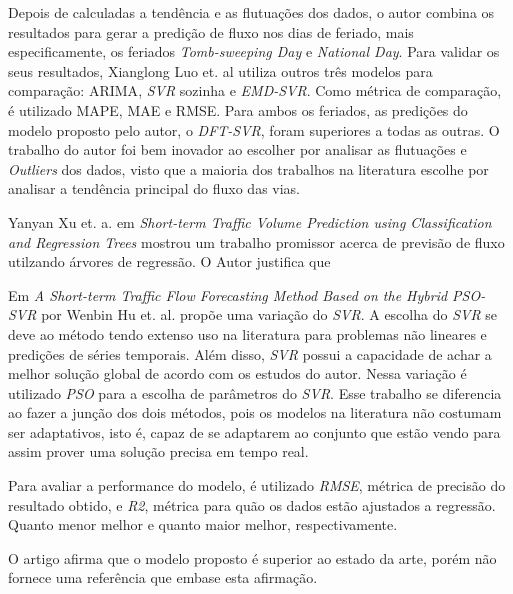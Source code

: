 Depois de calculadas a tendência e as flutuações dos dados, o autor combina os resultados para gerar a predição de fluxo nos dias de feriado, mais especificamente, os feriados \textit{ Tomb-sweeping Day} e \textit{National Day}. Para validar os seus resultados, Xianglong Luo et. al utiliza outros três modelos para comparação: \acrshort{ARIMA}, \textit{SVR} sozinha e \textit{EMD-SVR}. Como métrica de comparação, é utilizado \acrshort{MAPE}, \acrshort{MAE} e \acrshort{RMSE}.  Para ambos os feriados, as predições do modelo proposto pelo autor, o \textit{DFT-SVR}, foram superiores a todas as outras. O trabalho do autor foi bem inovador ao escolher por analisar as flutuações e \textit{Outliers} dos dados, visto que a maioria dos trabalhos na literatura escolhe por analisar a tendência principal do fluxo das vias.

Yanyan Xu et. a. em \textit{Short-term Traffic Volume Prediction using Classification and Regression Trees} \cite{xu2013short} mostrou um trabalho promissor acerca de previsão de fluxo utilzando árvores de regressão. O Autor justifica que  


Em \textit{A Short-term Traffic Flow Forecasting Method Based on the Hybrid PSO-SVR} por Wenbin Hu et. al. \cite{Hu2016} propõe uma variação do \textit{\acrfull{SVR}}. A escolha do \textit{\acrshort{SVR}} se deve ao método tendo extenso uso na literatura para problemas não lineares e predições de séries temporais. Além disso, \textit{\acrshort{SVR}} possui a capacidade de achar a melhor solução global de acordo com os estudos do autor. Nessa variação é utilizado \textit{\acrfull{PSO}} para a escolha de parâmetros do \textit{\acrshort{SVR}}. Esse trabalho se diferencia ao fazer a junção dos dois métodos, pois os modelos na literatura não costumam ser adaptativos, isto é, capaz de se adaptarem ao conjunto que estão vendo para assim prover uma solução precisa em tempo real.

Para avaliar a performance do modelo, é utilizado \textit{\acrshort{RMSE}}, métrica de precisão do resultado obtido, e \textit{\acrfull{R2}}, métrica para quão os dados estão ajustados a regressão. Quanto menor melhor e quanto maior melhor, respectivamente. 

O artigo afirma que o modelo proposto é superior ao estado da arte, porém não fornece uma referência que embase esta afirmação.
